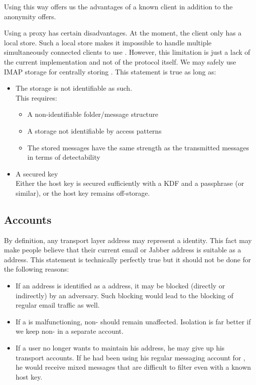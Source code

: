 Using \MessageVortex{} this way offers us the advantages of a known client in addition to the anonymity \MessageVortex{} offers.

Using a proxy has certain disadvantages. At the moment, the \MessageVortex{} client only has a local store. Such a local store makes it impossible to handle multiple simultaneously connected clients to use \MessageVortex. However, this limitation is just a lack of the current implementation and not of the protocol itself. We may safely use IMAP storage for centrally storing \VortexMessages{}. This statement is true as long as:
\begin{itemize}
	\item The storage is not identifiable as such.\\
	This requires:
	\begin{itemize}
		\item A non-identifiable folder/message structure
		\item A storage not identifiable by access patterns
		\item The stored messages have the same strength as the transmitted messages in terms of detectability
	\end{itemize}
	\item A secured key\\
	Either the host key is secured sufficiently with a KDF and a passphrase (or similar), or the host key remains off-storage.
\end{itemize}

\subsection{\MessageVortex{} Accounts}
By definition, any transport layer address may represent a \MessageVortex{} identity. This fact may make people believe that their current email or Jabber address is suitable as a \MessageVortex address. This statement is technically perfectly true but it should not be done for the following reasons:
\begin{itemize}
	\item If an address is identified as a \MessageVortex{} address, it may be blocked (directly or indirectly) by an adversary. Such blocking would lead to the blocking of regular email traffic as well.
	\item If a \VortexNode{} is malfunctioning, non-\VortexMessages{} should remain unaffected. Isolation is far better if we keep non-\VortexMessages{} in a separate account.
	\item If a user no longer wants to maintain his \MessageVortex{} address, he may give up his \MessageVortex transport accounts. If he had been using his regular messaging account for \MessageVortex, he would receive mixed messages that are difficult to filter even with a known host key.
\end{itemize}

